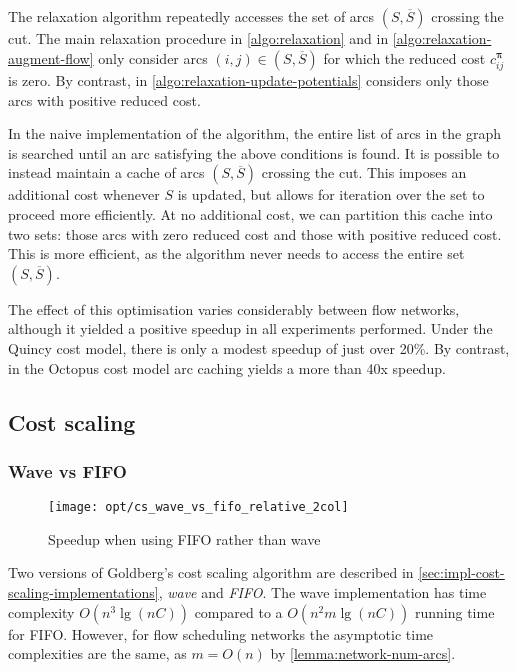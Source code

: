 The relaxation algorithm repeatedly accesses the set of arcs $\left(S,\overline{S}\right)$ crossing the cut. The main relaxation procedure in \cref{algo:relaxation} and  in \cref{algo:relaxation-augment-flow} only consider arcs $(i,j) \in \left(S,\overline{S}\right)$ for which the reduced cost $c_{ij}^{\boldsymbol{\pi}}$ is zero. By contrast,  in \cref{algo:relaxation-update-potentials} considers only those arcs with positive reduced cost.

In the naive implementation of the algorithm, the entire list of arcs in the graph is searched until an arc satisfying the above conditions is found. It is possible to instead maintain a cache of arcs $\left(S,\overline{S}\right)$ crossing the cut. This imposes an additional cost whenever $S$ is updated, but allows for iteration over the set to proceed more efficiently. At no additional cost, we can partition this cache into two sets: those arcs with zero reduced cost and those with positive reduced cost\footnotemark. This is more efficient, as the algorithm never needs to access the entire set $\left(S,\overline{S}\right)$.

The effect of this optimisation varies considerably between flow networks, although it yielded a positive speedup in all experiments performed. Under the Quincy cost model, there is only a modest speedup of just over 20\%. By contrast, in the Octopus cost model arc caching yields a more than 40x speedup\footnotemark.

\subsection{Cost scaling}

\subsubsection{Wave vs FIFO}

\begin{figure}
    \centering
    \texttt{[image: opt/cs\_wave\_vs\_fifo\_relative\_2col]}
    \caption{Speedup when using FIFO rather than wave}
    \label{fig:opt-cs-wave-vs-fifo}
\end{figure}


Two versions of Goldberg's cost scaling algorithm are described in \cref{sec:impl-cost-scaling-implementations}, \emph{wave} and \emph{FIFO}. The wave implementation has time complexity $O\left(n^3 \lg \left(nC\right)\right)$ compared to a $O\left(n^2m\lg\left(nC\right)\right)$ running time for FIFO. However, for flow scheduling networks the asymptotic time complexities are the same, as $m = O(n)$ by \cref{lemma:network-num-arcs}. 

